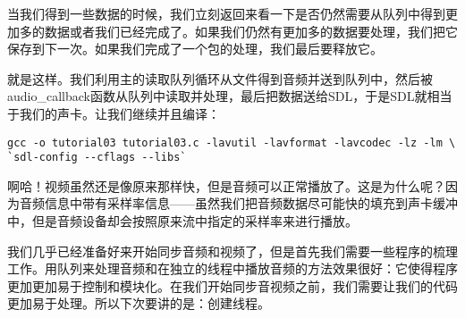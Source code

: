 当我们得到一些数据的时候，我们立刻返回来看一下是否仍然需要从队列中得到更加多的数据或者我们已经完成了。如果我们仍然有更加多的数据要处理，我们把它保存到下一次。如果我们完成了一个包的处理，我们最后要释放它。

就是这样。我们利用主的读取队列循环从文件得到音频并送到队列中，然后被audio_callback函数从队列中读取并处理，最后把数据送给SDL，于是SDL就相当于我们的声卡。让我们继续并且编译：

\begin{lstlisting}
gcc -o tutorial03 tutorial03.c -lavutil -lavformat -lavcodec -lz -lm \
`sdl-config --cflags --libs`
\end{lstlisting}

啊哈！视频虽然还是像原来那样快，但是音频可以正常播放了。这是为什么呢？因为音频信息中带有采样率信息——虽然我们把音频数据尽可能快的填充到声卡缓冲中，但是音频设备却会按照原来流中指定的采样率来进行播放。

我们几乎已经准备好来开始同步音频和视频了，但是首先我们需要一些程序的梳理工作。用队列来处理音频和在独立的线程中播放音频的方法效果很好：它使得程序更加更加易于控制和模块化。在我们开始同步音视频之前，我们需要让我们的代码更加易于处理。所以下次要讲的是：创建线程。
